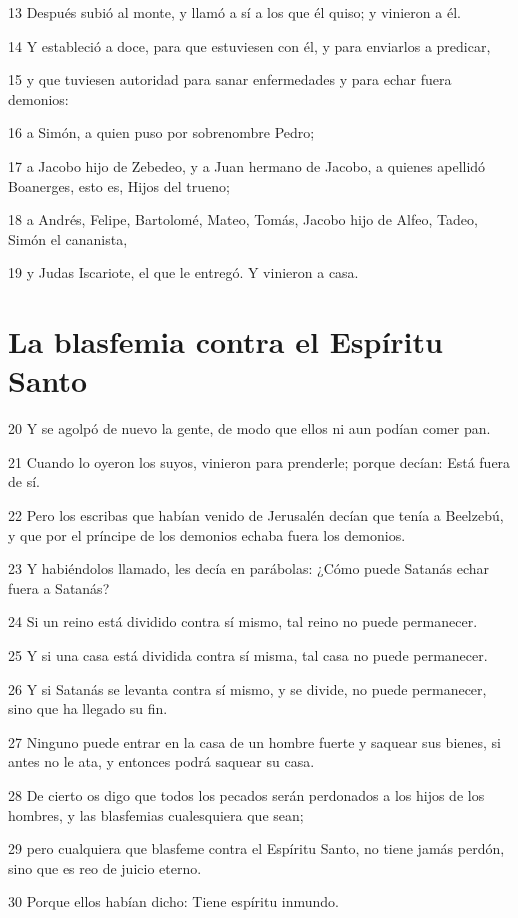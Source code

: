 \par 13 Después subió al monte, y llamó a sí a los que él quiso; y vinieron a él.
\par 14 Y estableció a doce, para que estuviesen con él, y para enviarlos a predicar,
\par 15 y que tuviesen autoridad para sanar enfermedades y para echar fuera demonios:
\par 16 a Simón, a quien puso por sobrenombre Pedro;
\par 17 a Jacobo hijo de Zebedeo, y a Juan hermano de Jacobo, a quienes apellidó Boanerges, esto es, Hijos del trueno;
\par 18 a Andrés, Felipe, Bartolomé, Mateo, Tomás, Jacobo hijo de Alfeo, Tadeo, Simón el cananista,
\par 19 y Judas Iscariote, el que le entregó. Y vinieron a casa.

\section*{La blasfemia contra el Espíritu Santo}

\par 20 Y se agolpó de nuevo la gente, de modo que ellos ni aun podían comer pan.
\par 21 Cuando lo oyeron los suyos, vinieron para prenderle; porque decían: Está fuera de sí.
\par 22 Pero los escribas que habían venido de Jerusalén decían que tenía a Beelzebú, y que por el príncipe de los demonios echaba fuera los demonios.
\par 23 Y habiéndolos llamado, les decía en parábolas: ¿Cómo puede Satanás echar fuera a Satanás?
\par 24 Si un reino está dividido contra sí mismo, tal reino no puede permanecer.
\par 25 Y si una casa está dividida contra sí misma, tal casa no puede permanecer.
\par 26 Y si Satanás se levanta contra sí mismo, y se divide, no puede permanecer, sino que ha llegado su fin.
\par 27 Ninguno puede entrar en la casa de un hombre fuerte y saquear sus bienes, si antes no le ata, y entonces podrá saquear su casa.
\par 28 De cierto os digo que todos los pecados serán perdonados a los hijos de los hombres, y las blasfemias cualesquiera que sean;
\par 29 pero cualquiera que blasfeme contra el Espíritu Santo, no tiene jamás perdón, sino que es reo de juicio eterno.
\par 30 Porque ellos habían dicho: Tiene espíritu inmundo.

